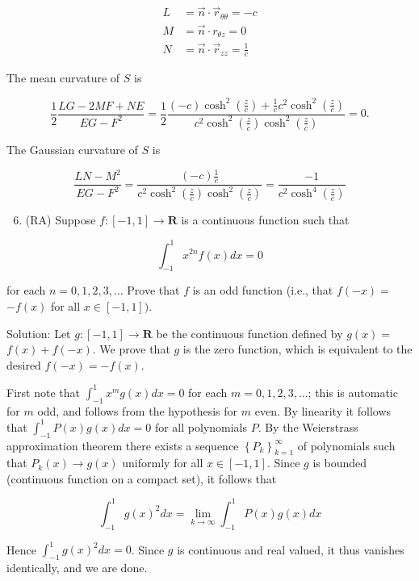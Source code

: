 \documentclass[10pt]{article}
\begin{document}
$$
\begin{aligned}
L & =\vec{n} \cdot \vec{r}_{\theta \theta}=-c \\
M & =\vec{n} \cdot r_{\theta z}=0 \\
N & =\vec{n} \cdot \vec{r}_{z z}=\frac{1}{c}
\end{aligned}
$$

The mean curvature of $S$ is

$$
\frac{1}{2} \frac{L G-2 M F+N E}{E G-F^{2}}=\frac{1}{2} \frac{(-c) \cosh ^{2}\left(\frac{z}{c}\right)+\frac{1}{c} c^{2} \cosh ^{2}\left(\frac{z}{c}\right)}{c^{2} \cosh ^{2}\left(\frac{z}{c}\right) \cosh ^{2}\left(\frac{z}{c}\right)}=0 .
$$

The Gaussian curvature of $S$ is

$$
\frac{L N-M^{2}}{E G-F^{2}}=\frac{(-c) \frac{1}{c}}{c^{2} \cosh ^{2}\left(\frac{z}{c}\right) \cosh ^{2}\left(\frac{z}{c}\right)}=\frac{-1}{c^{2} \cosh ^{4}\left(\frac{z}{c}\right)}
$$

\begin{enumerate}
  \setcounter{enumi}{5}
  \item (RA) Suppose $f:[-1,1] \rightarrow \mathbf{R}$ is a continuous function such that
\end{enumerate}

$$
\int_{-1}^{1} x^{2 n} f(x) d x=0
$$

for each $n=0,1,2,3, \ldots$ Prove that $f$ is an odd function (i.e., that $f(-x)=$ $-f(x)$ for all $x \in[-1,1])$.

Solution: Let $g:[-1,1] \rightarrow \mathbf{R}$ be the continuous function defined by $g(x)=$ $f(x)+f(-x)$. We prove that $g$ is the zero function, which is equivalent to the desired $f(-x)=-f(x)$.

First note that $\int_{-1}^{1} x^{m} g(x) d x=0$ for each $m=0,1,2,3, \ldots$; this is automatic for $m$ odd, and follows from the hypothesis for $m$ even. By linearity it follows that $\int_{-1}^{1} P(x) g(x) d x=0$ for all polynomials $P$. By the Weierstrass approximation theorem there exists a sequence $\left\{P_{k}\right\}_{k=1}^{\infty}$ of polynomials such that $P_{k}(x) \rightarrow g(x)$ uniformly for all $x \in[-1,1]$. Since $g$ is bounded (continuous function on a compact set), it follows that

$$
\int_{-1}^{1} g(x)^{2} d x=\lim _{k \rightarrow \infty} \int_{-1}^{1} P(x) g(x) d x
$$

Hence $\int_{-1}^{1} g(x)^{2} d x=0$. Since $g$ is continuous and real valued, it thus vanishes identically, and we are done.
\end{document}
